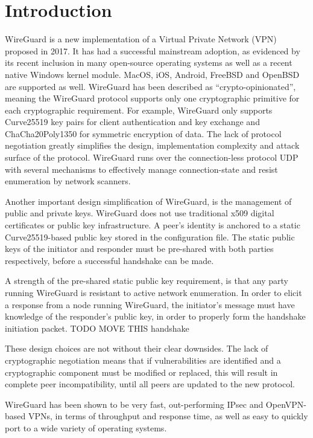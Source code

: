 \documentclass [11pt, proquest] {uwthesis}[2020/02/24]
\begin{document}
\textpages

\chapter {Introduction}

WireGuard is a new implementation of a Virtual Private Network (VPN) proposed in 2017. It has had a successful mainstream adoption, as evidenced by its recent inclusion in many open-source operating systems\cite{donenfeld_wireguard_nodate} as well as a recent native Windows kernel module\cite{noauthor_wireguard-nt_nodate}. MacOS, iOS, Android, FreeBSD and OpenBSD are supported as well.
WireGuard has been described as “crypto-opinionated”, meaning the WireGuard protocol supports only one cryptographic primitive for each cryptographic requirement.
For example, WireGuard only supports Curve25519 key pairs for client authentication and key exchange and ChaCha20Poly1350 for symmetric 
encryption\cite{donenfeld_wireguard_2017} of data.
The lack of protocol negotiation greatly simplifies the design, implementation complexity and attack surface of the protocol. 
WireGuard runs over the connection-less protocol UDP with several mechanisms to effectively manage connection-state and resist enumeration by network scanners.

Another important design simplification of WireGuard, is the management of public and private keys. WireGuard does not use traditional x509 digital certificates or public key infrastructure. A peer's identity is anchored to a static Curve25519-based public key stored in the configuration file.
The static public keys of the initiator and responder must be pre-shared with both parties respectively, before a successful handshake can be made. 

A strength of the pre-shared static public key requirement, is that any party running WireGuard is resistant to active network enumeration. In order to elicit a response from a node running WireGuard, the initiator's message must have knowledge of the responder's public key, in order to properly form the handshake initiation packet. {TODO MOVE THIS handshake}

These design choices are not without their clear downsides. The lack of cryptographic negotiation means that if vulnerabilities are identified and a cryptographic component must be modified or replaced, this will result in complete peer incompatibility, until all peers are updated to the new protocol.

WireGuard has been shown to be very fast, out-performing IPsec and OpenVPN-based VPNs, in terms of throughput and response time\cite{donenfeld_performance_2018}, as well as easy to quickly port to a wide variety of operating systems. 
\end{document}
